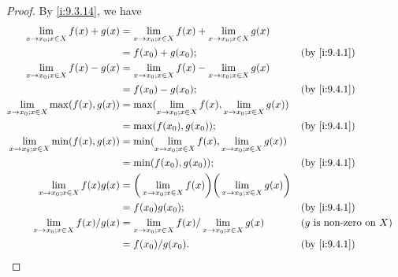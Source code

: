 \begin{proof}
  By \cref{i:9.3.14}, we have
  \begin{align*}
    \lim_{x \to x_0 ; x \in X} f(x) + g(x)      & = \lim_{x \to x_0 ; x \in X} f(x) + \lim_{x \to x_0 ; x \in X} g(x)                                                               \\
                                                & = f(x_0) + g(x_0);                                                                       &  & \by{i:9.4.1}                        \\
    \lim_{x \to x_0 ; x \in X} f(x) - g(x)      & = \lim_{x \to x_0 ; x \in X} f(x) - \lim_{x \to x_0 ; x \in X} g(x)                                                               \\
                                                & = f(x_0) - g(x_0);                                                                       &  & \by{i:9.4.1}                        \\
    \lim_{x \to x_0 ; x \in X} \max(f(x), g(x)) & = \max(\lim_{x \to x_0 ; x \in X} f(x), \lim_{x \to x_0 ; x \in X} g(x))                                                          \\
                                                & = \max(f(x_0), g(x_0));                                                                  &  & \by{i:9.4.1}                        \\
    \lim_{x \to x_0 ; x \in X} \min(f(x), g(x)) & = \min(\lim_{x \to x_0 ; x \in X} f(x), \lim_{x \to x_0 ; x \in X} g(x))                                                          \\
                                                & = \min(f(x_0), g(x_0));                                                                  &  & \by{i:9.4.1}                        \\
    \lim_{x \to x_0 ; x \in X} f(x) g(x)        & = \bigg(\lim_{x \to x_0 ; x \in X} f(x)\bigg)\bigg(\lim_{x \to x_0 ; x \in X} g(x)\bigg)                                          \\
                                                & = f(x_0) g(x_0);                                                                         &  & \by{i:9.4.1}                        \\
    \lim_{x \to x_0 ; x \in X} f(x) / g(x)      & = \lim_{x \to x_0 ; x \in X} f(x) / \lim_{x \to x_0 ; x \in X} g(x)                      &  & \text{(\(g\) is non-zero on \(X\))} \\
                                                & = f(x_0) / g(x_0).                                                                       &  & \by{i:9.4.1}                        \\
  \end{align*}
\end{proof}

